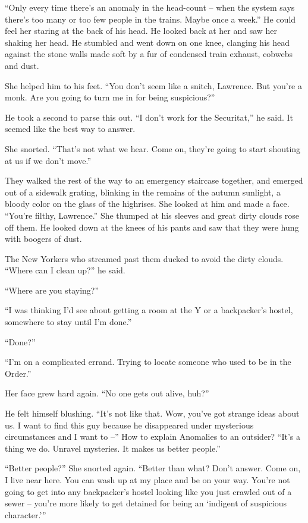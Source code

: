 “Only every time there's an anomaly in the head-count -- when the 
system says there's too many or too few people in the trains. Maybe 
once a week.” He could feel her staring at the back of his head. He 
looked back at her and saw her shaking her head. He stumbled and went 
down on one knee, clanging his head against the stone walls made soft 
by a fur of condensed train exhaust, cobwebs and dust.

She helped him to his feet. “You don't seem like a snitch, Lawrence. 
But you're a monk. Are you going to turn me in for being suspicious?”

He took a second to parse this out. “I don't work for the 
Securitat,” he said. It seemed like the best way to answer.

She snorted. “That's not what we hear. Come on, they're going to 
start shouting at us if we don't move.”

They walked the rest of the way to an emergency staircase together, and 
emerged out of a sidewalk grating, blinking in the remains of the 
autumn sunlight, a bloody color on the glass of the highrises. She 
looked at him and made a face. “You're filthy, Lawrence.” She 
thumped at his sleeves and great dirty clouds rose off them. He looked 
down at the knees of his pants and saw that they were hung with boogers 
of dust.

The New Yorkers who streamed past them ducked to avoid the dirty 
clouds. “Where can I clean up?” he said.

“Where are you staying?”

“I was thinking I'd see about getting a room at the Y or a 
backpacker's hostel, somewhere to stay until I'm done.”

“Done?”

“I'm on a complicated errand. Trying to locate someone who used to be 
in the Order.”

Her face grew hard again. “No one gets out alive, huh?”

He felt himself blushing. “It's not like that. Wow, you've got 
strange ideas about us. I want to find this guy because he disappeared 
under mysterious circumstances and I want to --” How to explain 
Anomalies to an outsider? “It's a thing we do. Unravel mysteries. It 
makes us better people.”

“Better people?” She snorted again. “Better than what? Don't 
answer. Come on, I live near here. You can wash up at my place and be 
on your way. You're not going to get into any backpacker's hostel 
looking like you just crawled out of a sewer -- you're more likely to 
get detained for being an `indigent of suspicious character.'”

